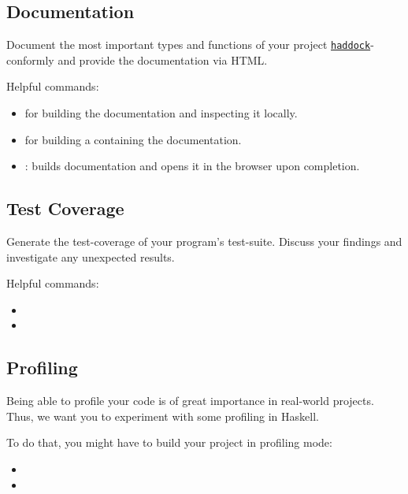 \documentclass{article}
\begin{document}
\subsection{Documentation}

Document the most important types and functions of your project \href{https://haskell-haddock.readthedocs.io/en/latest/markup.html}{\texttt{haddock}}-conformly and provide the documentation via HTML.

Helpful commands:

\begin{itemize}
\item {} for building the documentation and inspecting it locally.
\item {} for building a  containing the documentation.
\item {}: builds documentation and opens it in the browser upon completion.
\end{itemize}

\subsection{Test Coverage}

Generate the test-coverage of your program's test-suite.
Discuss your findings and investigate any unexpected results.

Helpful commands:

\begin{itemize}
\item {}
\item {}
\end{itemize}

\subsection{Profiling}

Being able to profile your code is of great importance in real-world projects. Thus, we want you to experiment with some profiling in Haskell.

To do that, you might have to build your project in profiling mode:

\begin{itemize}
\item {}
\item {}
\end{itemize}
\end{document}
